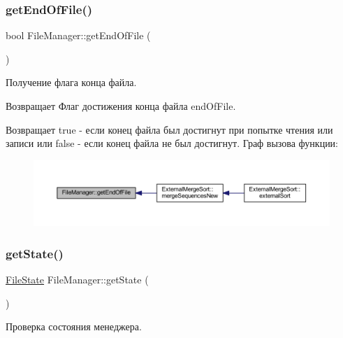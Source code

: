 \subsubsection{\texorpdfstring{get\+End\+Of\+File()}{getEndOfFile()}}
{\footnotesize\ttfamily bool File\+Manager\+::get\+End\+Of\+File (\begin{DoxyParamCaption}{ }\end{DoxyParamCaption})}



Получение флага конца файла. 

\begin{DoxyReturn}{Возвращает}
Флаг достижения конца файла end\+Of\+File.
\end{DoxyReturn}
Возвращает true -\/ если конец файла был достигнут при попытке чтения или записи или false -\/ если конец файла не был достигнут. Граф вызова функции\+:\nopagebreak
\begin{figure}[H]
\begin{center}
\leavevmode
\includegraphics[width=350pt]{class_file_manager_a49df99509ff2700e0e5edd06adca345c_icgraph}
\end{center}
\end{figure}
\hypertarget{class_file_manager_abd4cbc2b218ab1828ae376a4a9137057}{}\label{class_file_manager_abd4cbc2b218ab1828ae376a4a9137057} 
\subsubsection{\texorpdfstring{get\+State()}{getState()}}
{\footnotesize\ttfamily \hyperlink{_structures_8h_a57306ae0f9e356347388234ed69e0ce7}{File\+State} File\+Manager\+::get\+State (\begin{DoxyParamCaption}{ }\end{DoxyParamCaption})}



Проверка состояния менеджера. 

